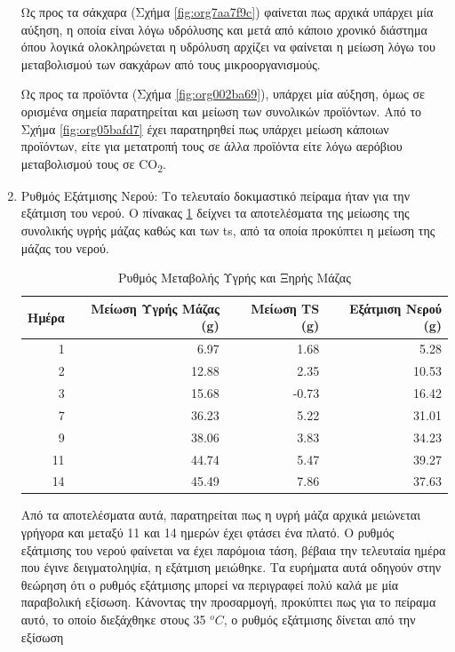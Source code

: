 \documentclass[11pt]{report}
\begin{document}
\begin{enumerate}
Ως προς τα σάκχαρα (Σχήμα \ref{fig:org7aa7f9c}) φαίνεται πως αρχικά υπάρχει μία αύξηση, η οποία είναι λόγω υδρόλυσης και μετά από κάποιο χρονικό διάστημα όπου λογικά ολοκληρώνεται η υδρόλυση αρχίζει να φαίνεται η μείωση λόγω του μεταβολισμού των σακχάρων από τους μικροοργανισμούς.

Ως προς τα προϊόντα (Σχήμα \ref{fig:org002ba69}), υπάρχει μία αύξηση, όμως σε ορισμένα σημεία παρατηρείται και μείωση των συνολικών προϊόντων. Από το Σχήμα \ref{fig:org05bafd7} έχει παρατηρηθεί πως υπάρχει μείωση κάποιων προϊόντων, είτε για μετατροπή τους σε άλλα προϊόντα είτε λόγω αερόβιου μεταβολισμού τους σε CO\textsubscript{2}.

\item Ρυθμός Εξάτμισης Νερού:
\label{sec:org472cf97}
Το τελευταίο δοκιμαστικό πείραμα ήταν για την εξάτμιση του νερού. Ο πίνακας \ref{tab:org71330e4} δείχνει τα αποτελέσματα της μείωσης της συνολικής υγρής μάζας καθώς και των \acrshort{ts}, από τα οποία προκύπτει η μείωση της μάζας του νερού.

\begin{table}[htbp]
\caption{\label{tab:org71330e4}Ρυθμός Μεταβολής Υγρής και Ξηρής Μάζας}
\centering
\begin{tabular}{rrrr}
Ημέρα & Μείωση Υγρής Μάζας (g) & Μείωση TS (g) & Εξάτμιση Νερού (g)\\[0pt]
\hline
1 & 6.97 & 1.68 & 5.28\\[0pt]
2 & 12.88 & 2.35 & 10.53\\[0pt]
3 & 15.68 & -0.73 & 16.42\\[0pt]
7 & 36.23 & 5.22 & 31.01\\[0pt]
9 & 38.06 & 3.83 & 34.23\\[0pt]
11 & 44.74 & 5.47 & 39.27\\[0pt]
14 & 45.49 & 7.86 & 37.63\\[0pt]
\end{tabular}
\end{table}

Από τα αποτελέσματα αυτά, παρατηρείται πως η υγρή μάζα αρχικά μειώνεται γρήγορα και μεταξύ 11 και 14 ημερών έχει φτάσει ένα πλατό. Ο ρυθμός εξάτμισης του νερού φαίνεται να έχει παρόμοια τάση, βέβαια την τελευταία ημέρα που έγινε δειγματοληψία, η εξάτμιση μειώθηκε. Τα ευρήματα αυτά οδηγούν στην θεώρηση ότι ο ρυθμός εξάτμισης μπορεί να περιγραφεί πολύ καλά με μία παραβολική εξίσωση. Κάνοντας την προσαρμογή, προκύπτει πως για το πείραμα αυτό, το οποίο διεξάχθηκε στους 35 \(^oC\), ο ρυθμός εξάτμισης δίνεται από την εξίσωση


\end{enumerate}
\end{document}
